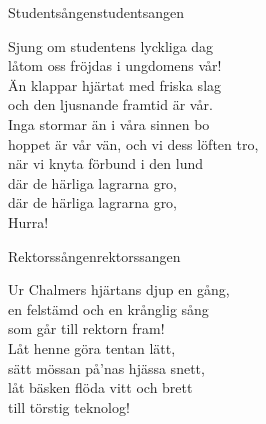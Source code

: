 \newpage

\begin{song}{Studentsången}{studentsangen}

\begin{vers}
Sjung om studentens lyckliga dag\\
låtom oss fröjdas i ungdomens vår!\\
Än klappar hjärtat med friska slag\\
och den ljusnande framtid är vår.\\
Inga stormar än i våra sinnen bo\\
hoppet är vår vän, och vi dess löften tro,\\
när vi knyta förbund i den lund\\
där de härliga lagrarna gro,\\
där de härliga lagrarna gro,\\
Hurra!\\
\end{vers}
\end{song}

\begin{song}{Rektorssången}{rektorssangen}
\begin{vers}
Ur Chalmers hjärtans djup en gång,\\
en felstämd och en krånglig sång\\
som går till rektorn fram!   \\
Låt henne göra tentan lätt,\\
sätt mössan på'nas hjässa snett,\\
låt bäsken flöda vitt och brett\\
till törstig teknolog!\\
\end{vers}
\end{song}

